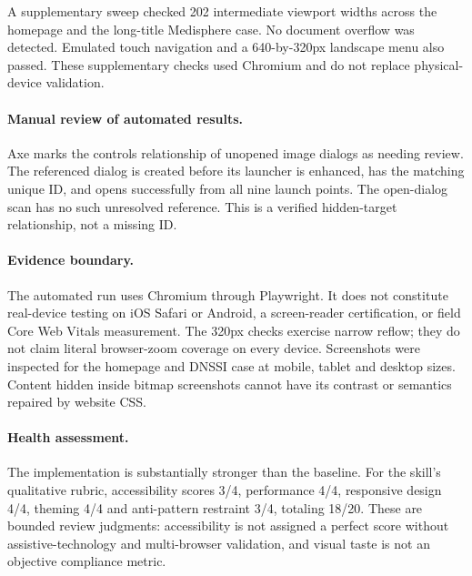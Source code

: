 \documentclass[11pt,a4paper]{article}
\begin{document}
A supplementary sweep checked 202 intermediate viewport widths across the homepage and the long-title Medisphere case. No document overflow was detected. Emulated touch navigation and a 640-by-320px landscape menu also passed. These supplementary checks used Chromium and do not replace physical-device validation.

\paragraph{Manual review of automated results.}
Axe marks the controls relationship of unopened image dialogs as needing review. The referenced dialog is created before its launcher is enhanced, has the matching unique ID, and opens successfully from all nine launch points. The open-dialog scan has no such unresolved reference. This is a verified hidden-target relationship, not a missing ID.

\paragraph{Evidence boundary.}
The automated run uses Chromium through Playwright. It does not constitute real-device testing on iOS Safari or Android, a screen-reader certification, or field Core Web Vitals measurement. The 320px checks exercise narrow reflow; they do not claim literal browser-zoom coverage on every device. Screenshots were inspected for the homepage and DNSSI case at mobile, tablet and desktop sizes. Content hidden inside bitmap screenshots cannot have its contrast or semantics repaired by website CSS.

\paragraph{Health assessment.}
The implementation is substantially stronger than the baseline. For the skill's qualitative rubric, accessibility scores 3/4, performance 4/4, responsive design 4/4, theming 4/4 and anti-pattern restraint 3/4, totaling 18/20. These are bounded review judgments: accessibility is not assigned a perfect score without assistive-technology and multi-browser validation, and visual taste is not an objective compliance metric.
\end{document}
